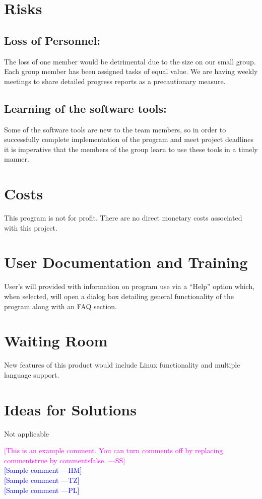 \documentclass[titlepage]{article}
\newcommand{\authornote}[3]{\textcolor{#1}{[#3 ---#2]}}
\newcommand{\authornote}[3]{}
\newcommand{\wss}[1]{\authornote{magenta}{SS}{#1}}
\newcommand{\hm}[1]{\authornote{blue}{HM}{#1}} %
\newcommand{\tz}[1]{\authornote{blue}{TZ}{#1}} %
\newcommand{\pl}[1]{\authornote{blue}{PL}{#1}} %
\begin{document}
\section{Risks }

\subsection*{Loss of Personnel:}The loss of one member would be detrimental due to the size on our small group. Each group member has been assigned tasks of equal value. We are having weekly meetings to share detailed progress reports as a precautionary measure. 

\subsection*{Learning of the software tools:} Some of the software tools are new to the team members, so in order to successfully complete implementation of the program and meet project deadlines it is imperative that the members of the group learn to use these tools in a timely manner.

\section{Costs }
This program is not for profit. There are no direct monetary costs associated with this project.

\section{User Documentation and Training }
User’s will provided with information on program use via a “Help” option which, when selected, will
open a dialog box detailing general functionality of the program along with an FAQ section.

\section{Waiting Room}
New features of this product would include Linux functionality and multiple language support.

\section{Ideas for Solutions}
Not applicable



\noindent \wss{This is an example comment.  You can turn comments off by replacing
  commentstrue by commentsfalse.}\\
\hm{Sample comment}\\
\tz{Sample comment}\\
\pl{Sample comment}
\end{document}
